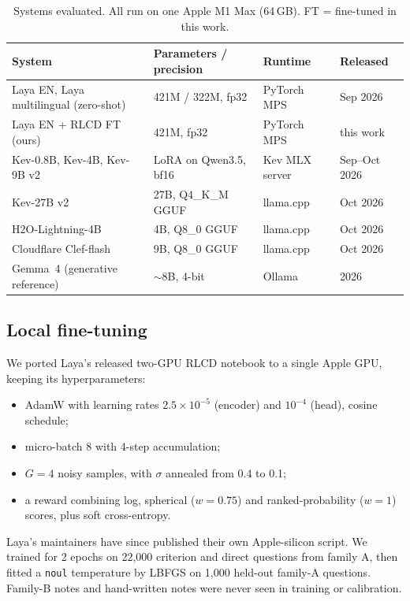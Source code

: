 \documentclass[11pt]{article}
\begin{document}
\begin{table}[t]\centering\small
\caption{Systems evaluated. All run on one Apple M1 Max (64\,GB). FT = fine-tuned in this work.}
\label{tab:systems}
\begin{tabular}{llll}\toprule
System & Parameters / precision & Runtime & Released \\ \midrule
Laya EN, Laya multilingual (zero-shot) & 421M / 322M, fp32 & PyTorch MPS & Sep 2026 \\
Laya EN + RLCD FT (ours) & 421M, fp32 & PyTorch MPS & this work \\
Kev-0.8B, Kev-4B, Kev-9B v2 & LoRA on Qwen3.5, bf16 & Kev MLX server & Sep--Oct 2026 \\
Kev-27B v2 & 27B, Q4\_K\_M GGUF & llama.cpp & Oct 2026 \\
H2O-Lightning-4B & 4B, Q8\_0 GGUF & llama.cpp & Oct 2026 \\
Cloudflare Clef-flash & 9B, Q8\_0 GGUF & llama.cpp & Oct 2026 \\
Gemma~4 (generative reference) & $\sim$8B, 4-bit & Ollama & 2026 \\
\bottomrule\end{tabular}
\end{table}

\subsection{Local fine-tuning}
\label{sec:ft}
We ported Laya's released two-GPU RLCD notebook to a single Apple GPU, keeping its hyperparameters:
\begin{itemize}[nosep]
\item AdamW with learning rates $2.5\times10^{-5}$ (encoder) and $10^{-4}$ (head), cosine schedule;
\item micro-batch 8 with 4-step accumulation;
\item $G{=}4$ noisy samples, with $\sigma$ annealed from 0.4 to 0.1;
\item a reward combining log, spherical ($w{=}0.75$) and ranked-probability ($w{=}1$) scores, plus soft cross-entropy.
\end{itemize}
Laya's maintainers have since published their own Apple-silicon script. We trained for 2 epochs on 22{,}000 criterion and direct questions from family A, then fitted a \texttt{noul} temperature by LBFGS on 1{,}000 held-out family-A questions.
Family-B notes and hand-written notes were never seen in training or calibration.
\end{document}
